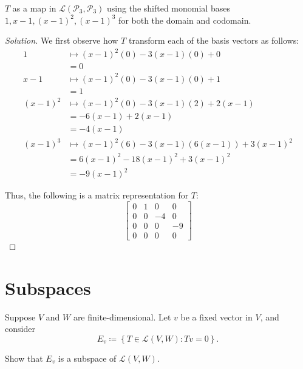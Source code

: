 \documentclass{article}
\newenvironment{solution}{\begin{proof}[Solution]}{\end{proof}}
\begin{document}
	\begin{hw}
		$T$ as a map in $\mathcal L(\mathscr{P}_{3}, \mathscr{P}_{3})$ using the shifted monomial bases $1, x-1, (x-1)^{2}, (x-1)^{3}$ for both the domain and codomain.
	\end{hw}
	\begin{solution}
		We first observe how $T$ transform each of the basis vectors as follows:
		\begin{align*}
			1 &\mapsto (x-1)^{2}(0) - 3(x-1)(0) + 0 \\
			&= 0 \\
			x-1 &\mapsto (x-1)^{2}(0) - 3(x-1)(0) + 1 \\
			&= 1 \\
			(x-1)^{2} &\mapsto (x-1)^{2}(0) - 3(x-1)(2) + 2(x-1) \\
			&= -6(x-1) + 2(x-1) \\
			&= -4(x-1) \\
			(x-1)^{3} &\mapsto (x-1)^{2}(6) - 3(x-1)(6(x-1)) + 3(x-1)^{2} \\
			&= 6(x-1)^{2} - 18(x-1)^{2} + 3(x-1)^{2} \\
			&= -9(x-1)^{2}
		\end{align*}
	
		Thus, the following is a matrix representation for $T$:
		\begin{equation*}
			\begin{bmatrix}
				0 & 1 & 0 & 0 \\
				0 & 0 & -4 & 0 \\
				0 & 0 & 0 & -9 \\
				0 & 0 & 0 & 0
			\end{bmatrix}
		\end{equation*}
	\end{solution}
	\newpage
	
	\section{Subspaces}
	
	\begin{hw}
		Suppose $V$ and $W$ are finite-dimensional. Let $v$ be a fixed vector in $V$, and consider
		\begin{equation*}
			E_{v} \coloneq \left\{  T \in \mathcal L(V,W) : Tv = 0 \right\}.
		\end{equation*}
	
		Show that $E_{v}$ is a subspace of $\mathcal{L}(V,W)$.
	\end{hw}
\end{document}
